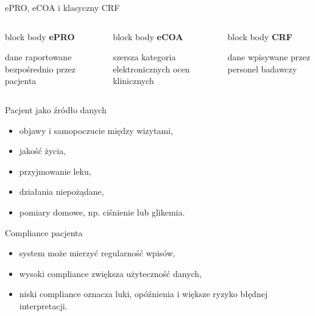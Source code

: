 \begin{frame}{ePRO, eCOA i klasyczny CRF}
  \begin{columns}[T,onlytextwidth]
    \begin{beamercolorbox}[wd=\linewidth,sep=0.8em,rounded=true]{block body}
      \textbf{\textcolor{UAFMTeal}{ePRO}}\par\medskip
      dane raportowane bezpośrednio przez pacjenta
    \end{beamercolorbox}

    \begin{beamercolorbox}[wd=\linewidth,sep=0.8em,rounded=true]{block body}
      \textbf{\textcolor{UAFMDarkBlue}{eCOA}}\par\medskip
      szersza kategoria elektronicznych ocen klinicznych
    \end{beamercolorbox}

    \begin{beamercolorbox}[wd=\linewidth,sep=0.8em,rounded=true]{block body}
      \textbf{\textcolor{UAFMOrange}{CRF}}\par\medskip
      dane wpisywane przez personel badawczy
    \end{beamercolorbox}
  \end{columns}
\end{frame}

\begin{frame}{Pacjent jako źródło danych}
  \begin{itemize}
    \item objawy i samopoczucie między wizytami,
    \item jakość życia,
    \item przyjmowanie leku,
    \item działania niepożądane,
    \item pomiary domowe, np. ciśnienie lub glikemia.
  \end{itemize}
\end{frame}

\begin{frame}{Compliance pacjenta}
  \begin{itemize}
    \item system może mierzyć regularność wpisów,
    \item wysoki compliance zwiększa użyteczność danych,
    \item niski compliance oznacza luki, opóźnienia i większe ryzyko błędnej interpretacji.
  \end{itemize}
\end{frame}

